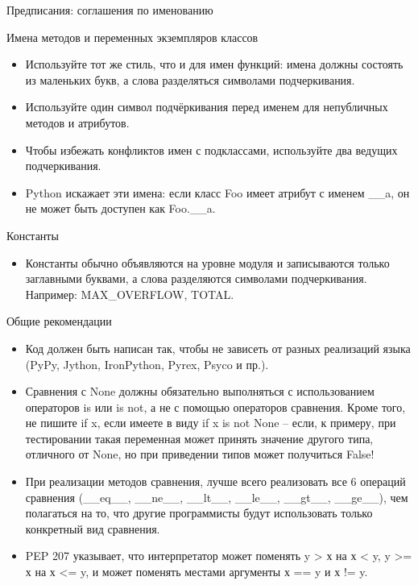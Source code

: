 \documentclass[xcolor=table]{beamer}
\begin{document}
\begin{frame}[fragile]{Предписания: соглашения по именованию}
	\begin{block}{Имена методов и переменных экземпляров классов}
		\begin{itemize}
			\item Используйте тот же стиль, что и для имен функций: имена должны состоять из маленьких букв, а слова разделяться символами подчеркивания.
			\item Используйте один символ подчёркивания перед именем для непубличных методов и атрибутов.
			\item Чтобы избежать конфликтов имен с подклассами, используйте два ведущих подчеркивания.
			\item Python искажает эти имена: если класс Foo имеет атрибут с именем \_\_a, он не может быть доступен как Foo.\_\_a.
		\end{itemize}			
	\end{block}
	\begin{block}{Константы}
		\begin{itemize}
			\item Константы обычно объявляются на уровне модуля и записываются только заглавными буквами, а слова разделяются символами подчеркивания. Например: MAX\_OVERFLOW, TOTAL.	
		\end{itemize}			
	\end{block}
\end{frame}

\begin{frame}[fragile]{Общие рекомендации}
	\begin{itemize}
		\item Код должен быть написан так, чтобы не зависеть от разных реализаций языка (PyPy, Jython, IronPython, Pyrex, Psyco и пр.).
		\item Сравнения с None должны обязательно выполняться с использованием операторов is или is not, а не с помощью операторов сравнения. Кроме того, не пишите if x, если имеете в виду if x is not None -- если, к примеру, при тестировании такая переменная может принять значение другого типа, отличного от None, но при приведении типов может получиться False!
		\item При реализации методов сравнения, лучше всего реализовать все 6 операций сравнения (\_\_eq\_\_, \_\_ne\_\_, \_\_lt\_\_, \_\_le\_\_, \_\_gt\_\_, \_\_ge\_\_), чем полагаться на то, что другие программисты будут использовать только конкретный вид сравнения.
		\item PEP 207 указывает, что интерпретатор может поменять y > х на х < y, y >= х на х <= y, и может поменять местами аргументы х == y и х != y. 		
	\end{itemize}			
\end{frame}
\end{document}
